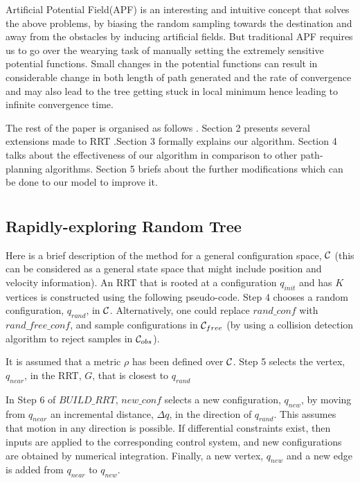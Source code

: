 \documentclass[runningheads]{llncs}
\begin{document}
Artificial Potential Field(APF) is an interesting and intuitive concept that solves the above problems, by biasing the random sampling towards the destination and away from the obstacles by inducing artificial fields. But traditional APF requires us to go over the wearying task of manually setting the extremely sensitive potential functions. Small changes in the potential functions can result in considerable change in both length of path generated and the rate of convergence and may also lead to the tree getting stuck in local minimum hence leading to infinite convergence time. 

The rest of the paper is organised as follows . Section 2  presents several extensions made to RRT .Section 3 formally explains our algorithm. Section 4 talks about the effectiveness of our algorithm in comparison to other path- planning algorithms. Section 5 briefs about the further modifications which can be done to our model to improve it.
\vspace{-2mm}  
\section{}

\subsection{Rapidly-exploring Random Tree}
Here is a brief description of the method for a general configuration space, ${\cal C}$ (this can be considered as a general state space that might include position and velocity information). An RRT that is rooted at a configuration $q_{init}$ and has $K$ vertices is constructed using the following pseudo-code. 
Step 4 chooses a random configuration, $q_{rand}$, in ${\cal C}$. Alternatively, one could replace $rand\_conf$ with $rand\_free\_conf$, and sample configurations in ${\cal C}_{free}$ (by using a collision detection algorithm to reject samples in ${\cal C}_{obs}$).

It is assumed that a metric $\rho$ has been defined over ${\cal C}$. Step 5 selects the vertex, $q_{near}$, in the RRT, $G$, that is closest to $q_{rand}$

In Step 6 of $BUILD\_RRT$, $new\_conf$ selects a new configuration, $q_{new}$, by moving from $q_{near}$ an incremental distance, $\Delta q$, in the direction of $q_{rand}$. This assumes that motion in any direction is possible. If differential constraints exist, then inputs are applied to the corresponding control system, and new configurations are obtained by numerical integration. Finally, a new vertex, $q_{new}$ and a new edge is added from $q_{near}$ to $q_{new}$.
\end{document}
